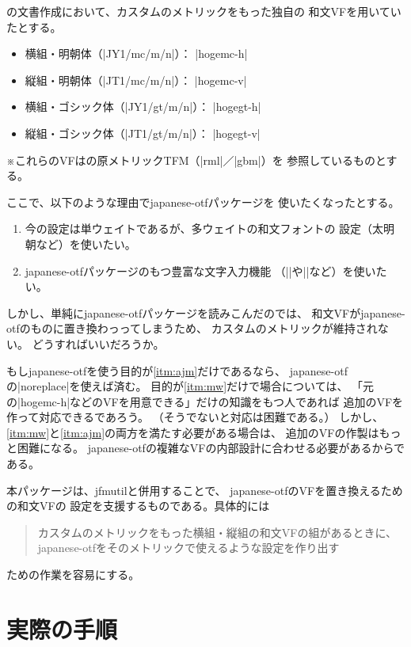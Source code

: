\documentclass[uplatex,dvipdfmx,a4paper]{jsarticle}
\newcommand{\Pkg}[1]{\textsf{#1}}
\newcommand{\Note}{\par\noindent ※}
\begin{document}
{\pLaTeX}の文書作成において、カスタムのメトリックをもった独自の
和文VFを用いていたとする。

\begin{itemize}
\item 横組・明朝体（|JY1/mc/m/n|）： |hogemc-h|
\item 縦組・明朝体（|JT1/mc/m/n|）： |hogemc-v|
\item 横組・ゴシック体（|JY1/gt/m/n|）： |hogegt-h|
\item 縦組・ゴシック体（|JT1/gt/m/n|）： |hogegt-v|
\end{itemize}

\Note これらのVFは{\pTeX}の原メトリックTFM（|rml|／|gbm|）を
参照しているものとする。

ここで、以下のような理由で\Pkg{japanese-otf}パッケージを
使いたくなったとする。
\begin{enumerate}
\item 今の設定は単ウェイトであるが、多ウェイトの和文フォントの
設定（太明朝など）を使いたい。\label{itm:mw}
\item \Pkg{japanese-otf}パッケージのもつ豊富な文字入力機能
（|\CID|や|\ajMaru|など）を使いたい。\label{itm:ajm}
\end{enumerate}
しかし、単純に\Pkg{japanese-otf}パッケージを読みこんだのでは、
和文VFが\Pkg{japanese-otf}のものに置き換わっってしまうため、
カスタムのメトリックが維持されない。
どうすればいいだろうか。

\medskip

もし\Pkg{japanese-otf}を使う目的が\ref{itm:ajm}だけであるなら、
\Pkg{japanese-otf}の|noreplace|を使えば済む。
目的が\ref{itm:mw}だけで場合については、
「元の|hogemc-h|などのVFを用意できる」だけの知識をもつ人であれば
追加のVFを作って対応できるであろう。
（そうでないと対応は困難である。）
しかし、\ref{itm:mw}と\ref{itm:ajm}の両方を満たす必要がある場合は、
追加のVFの作製はもっと困難になる。
\Pkg{japanese-otf}の複雑なVFの内部設計に合わせる必要があるからである。

\medskip

本パッケージは、\Pkg{jfmutil}と併用することで、
\Pkg{japanese-otf}のVFを置き換えるための和文VFの
設定を支援するものである。具体的には
\begin{quote}
カスタムのメトリックをもった横組・縦組の和文VFの組があるときに、
\Pkg{japanese-otf}をそのメトリックで使えるような設定を作り出す
\end{quote}
ための作業を容易にする。

\section{実際の手順}
\label{sec:Procedure}
\end{document}
